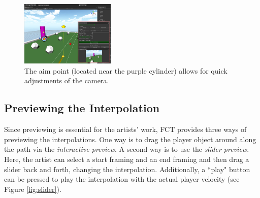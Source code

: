 
\begin{figure}[htbp]
\centering
\includegraphics[width=0.4\textwidth]{Pics/aimPoint}
\caption{The aim point (located near the purple cylinder) allows for quick adjustments of the camera.}
\label{fig:aimPoint}
\end{figure}


\subsection{Previewing the Interpolation}
Since previewing is essential for the artists' work, FCT provides three ways of previewing the interpolations. One way is to drag the player object around along the path via the \textit{interactive preview}. A second way is to use the \textit{slider preview}. Here, the artist can select a start framing and an end framing and then drag a slider back and forth, changing the interpolation. Additionally, a ``play" button can be pressed to play the interpolation with the actual player velocity (see Figure \ref{fig:slider}).

